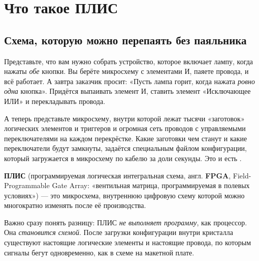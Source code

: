 \chapter{Что такое ПЛИС}
\label{ch:fpga}

\section{Схема, которую можно перепаять без паяльника}

Представьте, что вам нужно собрать устройство, которое включает лампу,
когда нажаты \emph{обе} кнопки. Вы берёте микросхему с элементами И,
паяете провода, и всё работает. А завтра заказчик просит: «Пусть лампа
горит, когда нажата \emph{ровно одна} кнопка». Придётся выпаивать
элемент И, ставить элемент «Исключающее ИЛИ» и перекладывать провода.

А теперь представьте микросхему, внутри которой лежат тысячи
«заготовок» логических элементов и триггеров и огромная сеть
проводов с управляемыми переключателями на каждом перекрёстке. Какие
заготовки чем станут и какие переключатели будут замкнуты, задаётся
специальным файлом конфигурации, который загружается в микросхему по кабелю
за доли секунды. Это и есть .

\begin{ideabox}
\textbf{ПЛИС} (программируемая логическая интегральная схема, англ.
\textbf{FPGA}, Field-Programmable Gate Array: «вентильная матрица,
программируемая в полевых условиях») --- это микросхема, внутреннюю
цифровую схему которой можно многократно изменять после её производства.
\end{ideabox}

Важно сразу понять разницу: ПЛИС \emph{не выполняет программу}, как
процессор. Она \emph{становится схемой}. После загрузки конфигурации внутри
кристалла существуют настоящие логические элементы и настоящие провода,
по которым сигналы бегут одновременно, как в схеме на макетной плате.

